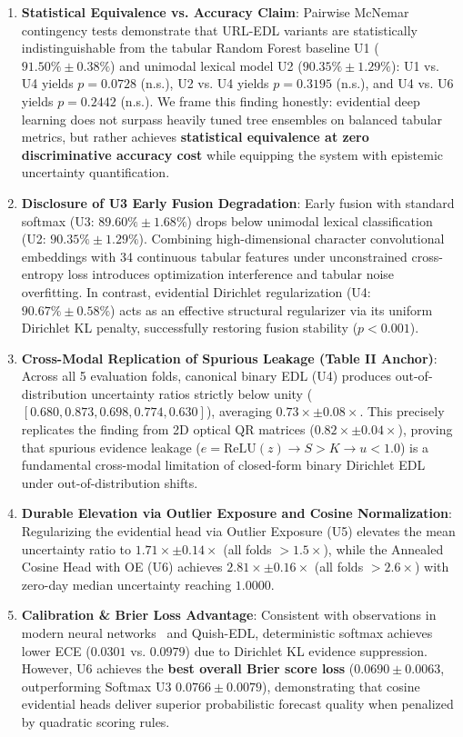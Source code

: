 \documentclass[conference]{IEEEtran}
\begin{document}
\begin{enumerate}
    \item \textbf{Statistical Equivalence vs. Accuracy Claim}: Pairwise McNemar contingency tests demonstrate that URL-EDL variants are statistically indistinguishable from the tabular Random Forest baseline U1 ($91.50\% \pm 0.38\%$) and unimodal lexical model U2 ($90.35\% \pm 1.29\%$): U1 vs. U4 yields $p = 0.0728$ (n.s.), U2 vs. U4 yields $p = 0.3195$ (n.s.), and U4 vs. U6 yields $p = 0.2442$ (n.s.). We frame this finding honestly: evidential deep learning does not surpass heavily tuned tree ensembles on balanced tabular metrics, but rather achieves \textbf{statistical equivalence at zero discriminative accuracy cost} while equipping the system with epistemic uncertainty quantification.
    \item \textbf{Disclosure of U3 Early Fusion Degradation}: Early fusion with standard softmax (U3: $89.60\% \pm 1.68\%$) drops below unimodal lexical classification (U2: $90.35\% \pm 1.29\%$). Combining high-dimensional character convolutional embeddings with 34 continuous tabular features under unconstrained cross-entropy loss introduces optimization interference and tabular noise overfitting. In contrast, evidential Dirichlet regularization (U4: $90.67\% \pm 0.58\%$) acts as an effective structural regularizer via its uniform Dirichlet KL penalty, successfully restoring fusion stability ($p < 0.001$).
    \item \textbf{Cross-Modal Replication of Spurious Leakage (Table II Anchor)}: Across all 5 evaluation folds, canonical binary EDL (U4) produces out-of-distribution uncertainty ratios strictly below unity ($[0.680, 0.873, 0.698, 0.774, 0.630]$), averaging \textbf{$0.73\times \pm 0.08\times$}. This precisely replicates the finding from 2D optical QR matrices ($0.82\times \pm 0.04\times$), proving that spurious evidence leakage ($e = \text{ReLU}(z) \to S > K \to u < 1.0$) is a fundamental cross-modal limitation of closed-form binary Dirichlet EDL under out-of-distribution shifts.
    \item \textbf{Durable Elevation via Outlier Exposure and Cosine Normalization}: Regularizing the evidential head via Outlier Exposure (U5) elevates the mean uncertainty ratio to $1.71\times \pm 0.14\times$ (all folds $>1.5\times$), while the Annealed Cosine Head with OE (U6) achieves \textbf{$2.81\times \pm 0.16\times$} (all folds $>2.6\times$) with zero-day median uncertainty reaching $1.0000$.
    \item \textbf{Calibration \& Brier Loss Advantage}: Consistent with observations in modern neural networks~\cite{guo2017} and Quish-EDL, deterministic softmax achieves lower ECE ($0.0301$ vs. $0.0979$) due to Dirichlet KL evidence suppression. However, U6 achieves the \textbf{best overall Brier score loss} ($0.0690 \pm 0.0063$, outperforming Softmax U3 $0.0766 \pm 0.0079$), demonstrating that cosine evidential heads deliver superior probabilistic forecast quality when penalized by quadratic scoring rules.

\end{enumerate}
\end{document}
